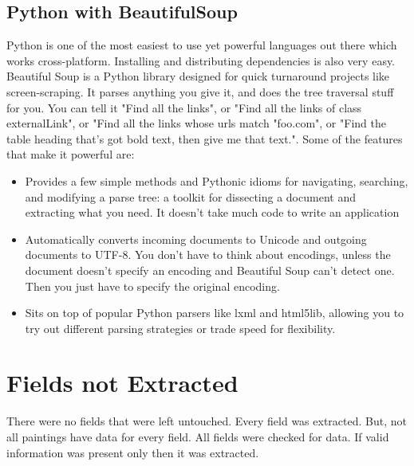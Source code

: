 \documentclass{article}
\begin{document}
\begin{flushleft}
\subsection{Python with BeautifulSoup}
Python is one of the most easiest to use yet powerful languages out there which works cross-platform. Installing and distributing dependencies is also very easy. Beautiful Soup is a Python library designed for quick turnaround projects like screen-scraping.
It parses anything you give it, and does the tree traversal stuff for you. You can tell it "Find all the links", or "Find all the links of class externalLink", or "Find all the links whose urls match "foo.com", or "Find the table heading that's got bold text, then give me that text.". Some of the features that make it powerful are:
\begin{itemize}
\item Provides a few simple methods and Pythonic idioms for navigating, searching, and modifying a parse tree: a toolkit for dissecting a document and extracting what you need. It doesn't take much code to write an application
\item {Automatically converts incoming documents to Unicode and outgoing documents to UTF-8. You don't have to think about encodings, unless the document doesn't specify an encoding and Beautiful Soup can't detect one. Then you just have to specify the original encoding.}
\item{Sits on top of popular Python parsers like lxml and html5lib, allowing you to try out different parsing strategies or trade speed for flexibility.}
\end{itemize}

\section{Fields not Extracted}
There were no fields that were left untouched. Every field was extracted. But, not all paintings have data for every field. All fields were checked for data. If valid information was present only then it was extracted.

\end{flushleft}
\end{document}
